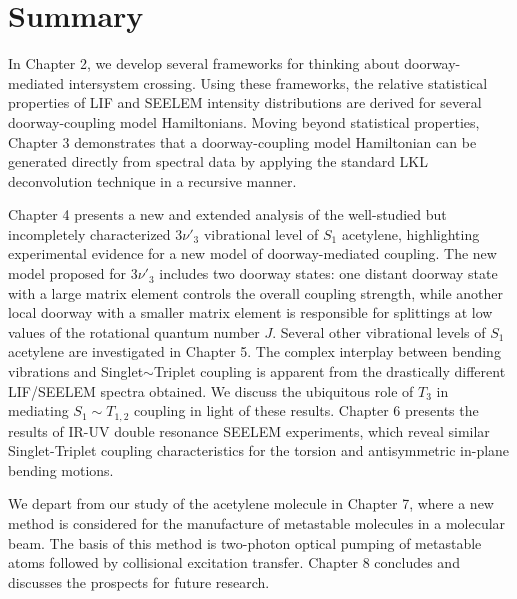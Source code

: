 \message{ !name(chapter1-introduction.tex)}\documentclass[12pt]{mitthesis}
\begin{document}
\section{Summary}

In Chapter 2, we develop several frameworks for thinking about
doorway-mediated intersystem crossing.  Using these frameworks, the
relative statistical properties of LIF and SEELEM intensity
distributions are derived for several doorway-coupling model
Hamiltonians.  Moving beyond statistical properties, Chapter 3
demonstrates that a doorway-coupling model Hamiltonian can be
generated directly from spectral data by applying the standard LKL
deconvolution technique in a recursive manner.

Chapter 4 presents a new and extended analysis of the well-studied but
incompletely characterized $3\nu'_3$ vibrational level of $S_1$
acetylene, highlighting experimental evidence for a new model of
doorway-mediated coupling.  The new model proposed for $3\nu'_3$
includes two doorway states: one distant doorway state with a large
matrix element controls the overall coupling strength, while another
local doorway with a smaller matrix element is responsible for
splittings at low values of the rotational quantum number $J$.
Several other vibrational levels of $S_1$ acetylene are investigated
in Chapter 5.  The complex interplay between bending vibrations and
Singlet$\sim$Triplet coupling is apparent from the drastically
different LIF/SEELEM spectra obtained.  We discuss the ubiquitous role
of $T_3$ in mediating $S_1 \sim T_{1,2}$ coupling in light of these
results.  Chapter 6 presents the results of IR-UV double resonance
SEELEM experiments, which reveal similar Singlet-Triplet coupling
characteristics for the torsion and antisymmetric in-plane bending
motions.

We depart from our study of the acetylene molecule in Chapter 7, where
a new method is considered for the manufacture of metastable molecules
in a molecular beam.  The basis of this method is two-photon optical
pumping of metastable atoms followed by collisional excitation
transfer.  Chapter 8 concludes and discusses the prospects for future
research.
\end{document}
